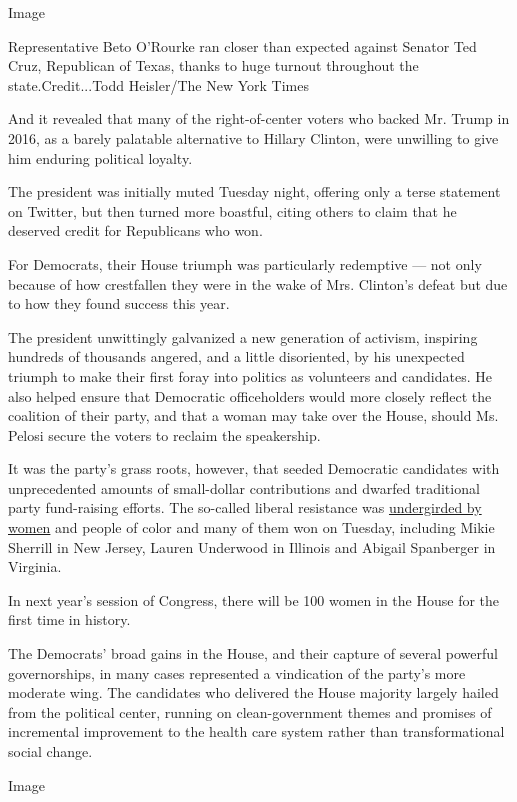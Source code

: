 Image

Representative Beto O'Rourke ran closer than expected against Senator
Ted Cruz, Republican of Texas, thanks to huge turnout throughout the
state.Credit...Todd Heisler/The New York Times

And it revealed that many of the right-of-center voters who backed Mr.
Trump in 2016, as a barely palatable alternative to Hillary Clinton,
were unwilling to give him enduring political loyalty.

The president was initially muted Tuesday night, offering only a terse
statement on Twitter, but then turned more boastful, citing others to
claim that he deserved credit for Republicans who won.

For Democrats, their House triumph was particularly redemptive --- not
only because of how crestfallen they were in the wake of Mrs. Clinton's
defeat but due to how they found success this year.

The president unwittingly galvanized a new generation of activism,
inspiring hundreds of thousands angered, and a little disoriented, by
his unexpected triumph to make their first foray into politics as
volunteers and candidates. He also helped ensure that Democratic
officeholders would more closely reflect the coalition of their party,
and that a woman may take over the House, should Ms. Pelosi secure the
voters to reclaim the speakership.

It was the party's grass roots, however, that seeded Democratic
candidates with unprecedented amounts of small-dollar contributions and
dwarfed traditional party fund-raising efforts. The so-called liberal
resistance was
\href{https://www.nytimes.com/2018/11/06/us/politics/women-midterms-historic.html}{undergirded
by women} and people of color and many of them won on Tuesday, including
Mikie Sherrill in New Jersey, Lauren Underwood in Illinois and Abigail
Spanberger in Virginia.

In next year's session of Congress, there will be 100 women in the House
for the first time in history.

The Democrats' broad gains in the House, and their capture of several
powerful governorships, in many cases represented a vindication of the
party's more moderate wing. The candidates who delivered the House
majority largely hailed from the political center, running on
clean-government themes and promises of incremental improvement to the
health care system rather than transformational social change.

Image

